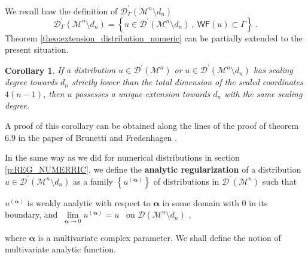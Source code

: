 \documentclass[11pt]{book}
\newcommand{\WF}{\mathsf{WF}}
\newcommand{\alphabd}{\boldsymbol{\alpha}}
\newcommand{\Dcal}{\mathcal{D}}
\newcommand{\Mcal}{\mathcal{M}}
\theoremstyle{break}
\newtheorem{corollary}{Corollary}[chapter]
\begin{document}
We recall haw the definition of $\mathcal{D}^\prime_\Gamma(\Mcal^n\setminus d_n)$
%
\begin{equation*}
\mathcal{D}^\prime_\Gamma(\Mcal^n\setminus d_n) = \left\{ u \in \mathcal{D}^\prime(\Mcal^n\setminus d_n) \ , \ \WF(u) \subset \Gamma \right\} \ .
\end{equation*}
%
Theorem \ref{theo:extension_distribution_numeric} can be partially extended to the present situation. 

\begin{corollary}\label{corol:theo_sd_M}
If a distribution $u \in\Dcal^\prime(\Mcal^n)$ or $u\in\Dcal^\prime(\Mcal^n\setminus d_n)$ has scaling degree towards $d_n$ strictly lower than the total dimension of the scaled coordinates $4(n-1)$, then $u$ possesses a unique extension towards $d_n$ with the same scaling degree. 
\end{corollary}
%
A proof of this corollary can be obtained along the lines of the proof of theorem 6.9 in the paper of Brunetti and Fredenhagen \cite{BF_2000}.


In the same way as we did for numerical distributions in section \ref{p:REG_NUMERRIC}, we define the \textbf{analytic regularization} of a distribution $u \in \Dcal^\prime(\Mcal^n\setminus d_n)$ as a family $\left\{ u^{(\alphabd)}\right\}$ of distributions in $\Dcal^\prime(\Mcal^n)$  such that
%
\begin{center}
$u^{(\alphabd)}$ is weakly analytic with respect to $\alphabd$ in some domain with $0$ in its boundary, and $\ \underset{\alphabd\to 0}{\lim} u^{(\alphabd)} = u$ \ on $\Dcal(\Mcal^n\setminus d_n)$ ,
\end{center}
%
where $\alphabd$ is a multivariate complex parameter. We shall define the notion of multivariate analytic function.
\end{document}
